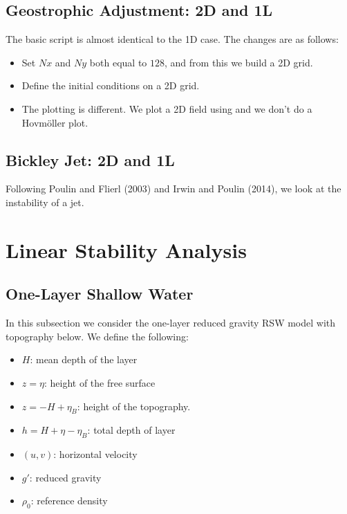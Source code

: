 \documentclass[letterpaper,10pt,english]{sphinxmanual}
\begin{document}
\section{Geostrophic Adjustment: 2D and 1L}
\label{examples:geostrophic-adjustment-2d-and-1l}
The basic script is almost identical to the 1D case. The changes are as
follows:
\begin{itemize}
\item {} 
Set \(Nx\) and \(Ny\) both equal to \(128\), and from
this we build a 2D grid.

\item {} 
Define the initial conditions on a 2D grid.

\item {} 
The plotting is different. We plot a 2D field using and we don’t do a
Hovmöller plot.

\end{itemize}


\section{Bickley Jet: 2D and 1L}
\label{examples:bickley-jet-2d-and-1l}
Following Poulin and Flierl (2003) and Irwin and Poulin (2014), we look
at the instability of a jet.


\chapter{Linear Stability Analysis}
\label{linear_stability::doc}\label{linear_stability:linear-stability-analysis}

\section{One-Layer Shallow Water}
\label{linear_stability:one-layer-shallow-water}
In this subsection we consider the one-layer reduced gravity RSW model
with topography below. We define the following:
\begin{itemize}
\item {} 
\(H\): mean depth of the layer

\item {} 
\(z=\eta\): height of the free surface

\item {} 
\(z=-H + \eta_B\): height of the topography.

\item {} 
\(h = H + \eta - \eta_B\): total depth of layer

\item {} 
\((u,v)\): horizontal velocity

\item {} 
\(g'\): reduced gravity

\item {} 
\(\rho_0\): reference density

\end{itemize}
\end{document}
